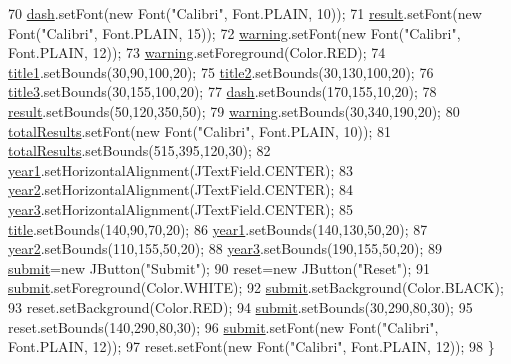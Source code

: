 \begin{DoxyCode}
70         \hyperlink{classGuiQuery1_a40b4913205157f6e39c46956654a11f2}{dash}.setFont(\textcolor{keyword}{new} Font(\textcolor{stringliteral}{"Calibri"}, Font.PLAIN, 10));  
71         \hyperlink{classGuiQuery1_a80ba7c84c9af8294566e3c1f1787c4a3}{result}.setFont(\textcolor{keyword}{new} Font(\textcolor{stringliteral}{"Calibri"}, Font.PLAIN, 15));
72         \hyperlink{classGuiQuery1_a382ff58e8c0283a69f6d88249b1fe496}{warning}.setFont(\textcolor{keyword}{new} Font(\textcolor{stringliteral}{"Calibri"}, Font.PLAIN, 12));
73         \hyperlink{classGuiQuery1_a382ff58e8c0283a69f6d88249b1fe496}{warning}.setForeground(Color.RED);
74         \hyperlink{classGuiQuery1_a31e28191d4f156f0367a7dac29b65836}{title1}.setBounds(30,90,100,20);
75         \hyperlink{classGuiQuery1_ad120c79c1fe5e4b3ce09960942924c0d}{title2}.setBounds(30,130,100,20);
76         \hyperlink{classGuiQuery1_a8e28412d9118fc61abde587c3bf7574f}{title3}.setBounds(30,155,100,20);
77         \hyperlink{classGuiQuery1_a40b4913205157f6e39c46956654a11f2}{dash}.setBounds(170,155,10,20);
78         \hyperlink{classGuiQuery1_a80ba7c84c9af8294566e3c1f1787c4a3}{result}.setBounds(50,120,350,50);
79         \hyperlink{classGuiQuery1_a382ff58e8c0283a69f6d88249b1fe496}{warning}.setBounds(30,340,190,20);
80         \hyperlink{classGuiQuery1_a515a1ac46f1362d811dd6e0c27d842fc}{totalResults}.setFont(\textcolor{keyword}{new} Font(\textcolor{stringliteral}{"Calibri"}, Font.PLAIN, 10));
81         \hyperlink{classGuiQuery1_a515a1ac46f1362d811dd6e0c27d842fc}{totalResults}.setBounds(515,395,120,30);
82         \hyperlink{classGuiQuery1_a8659841dac2a5dcf9b367a7b19a19a52}{year1}.setHorizontalAlignment(JTextField.CENTER);
83         \hyperlink{classGuiQuery1_a012c8e122c0a83d0af4ca51d03932c37}{year2}.setHorizontalAlignment(JTextField.CENTER);
84         \hyperlink{classGuiQuery1_ac74d62ae05c068aaa998c52121501978}{year3}.setHorizontalAlignment(JTextField.CENTER);
85         \hyperlink{classGuiQuery1_aeebb26c926dc7045d9bd99dd3568eb45}{title}.setBounds(140,90,70,20);
86         \hyperlink{classGuiQuery1_a8659841dac2a5dcf9b367a7b19a19a52}{year1}.setBounds(140,130,50,20);
87         \hyperlink{classGuiQuery1_a012c8e122c0a83d0af4ca51d03932c37}{year2}.setBounds(110,155,50,20);
88         \hyperlink{classGuiQuery1_ac74d62ae05c068aaa998c52121501978}{year3}.setBounds(190,155,50,20);
89         \hyperlink{classGUIQuery_a6580b15e365bc754c1a5ccdd2d58a4bb}{submit}=\textcolor{keyword}{new} JButton(\textcolor{stringliteral}{"Submit"});
90         reset=\textcolor{keyword}{new} JButton(\textcolor{stringliteral}{"Reset"});
91         \hyperlink{classGUIQuery_a6580b15e365bc754c1a5ccdd2d58a4bb}{submit}.setForeground(Color.WHITE);
92         \hyperlink{classGUIQuery_a6580b15e365bc754c1a5ccdd2d58a4bb}{submit}.setBackground(Color.BLACK);
93         reset.setBackground(Color.RED);
94         \hyperlink{classGUIQuery_a6580b15e365bc754c1a5ccdd2d58a4bb}{submit}.setBounds(30,290,80,30);
95         reset.setBounds(140,290,80,30);
96         \hyperlink{classGUIQuery_a6580b15e365bc754c1a5ccdd2d58a4bb}{submit}.setFont(\textcolor{keyword}{new} Font(\textcolor{stringliteral}{"Calibri"}, Font.PLAIN, 12));
97         reset.setFont(\textcolor{keyword}{new} Font(\textcolor{stringliteral}{"Calibri"}, Font.PLAIN, 12));
98     \}
\end{DoxyCode}
